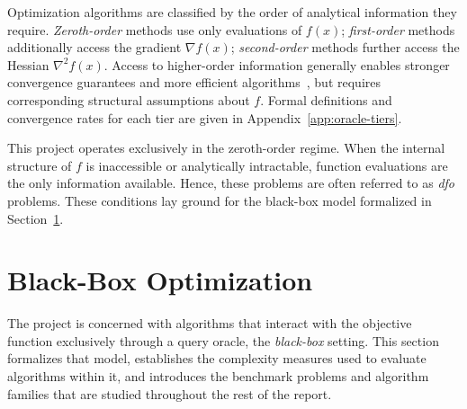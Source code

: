 Optimization algorithms are classified by the order of analytical
information they require. \textit{Zeroth-order} methods use only
evaluations of $f(x)$; \textit{first-order} methods additionally
access the gradient $\nabla f(x)$; \textit{second-order} methods
further access the Hessian $\nabla^2 f(x)$. Access to higher-order
information generally enables stronger convergence guarantees and more
efficient algorithms~\cite{nocedal2006numerical}, but requires
corresponding structural
assumptions about $f$. Formal definitions
and convergence rates for each tier are given in
Appendix~\ref{app:oracle-tiers}.

This project operates exclusively in the zeroth-order regime.
When the internal structure of $f$ is inaccessible or analytically
intractable, function evaluations are the only information available.
Hence, these problems are often referred to as \textit{\acrfull{dfo}}
problems. These conditions lay ground for the black-box model formalized in
Section~\ref{sec:bbo}.


\section{Black-Box Optimization}
\label{sec:bbo}
The project is concerned with algorithms that interact with the
objective function exclusively through a query oracle, the
\textit{black-box} setting. This section formalizes that model,
establishes the complexity measures used to evaluate algorithms
within it, and introduces the benchmark problems and algorithm
families that are studied throughout the rest of the report.

